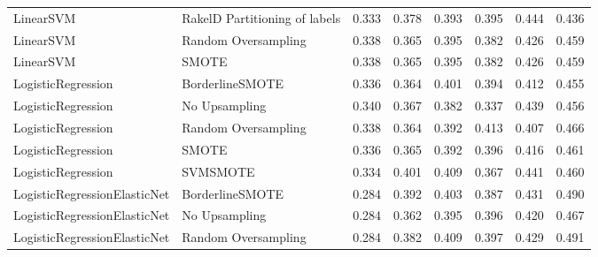 \begin{tabular}{llllllll}
                      LinearSVM & RakelD Partitioning of labels & 0.333 &                     0.378 &                 0.393 &                  0.395 &                                   0.444 &     0.436 \\
                      LinearSVM &           Random Oversampling & 0.338 &                     0.365 &                 0.395 &                  0.382 &                                   0.426 &     0.459 \\
                      LinearSVM &                         SMOTE & 0.338 &                     0.365 &                 0.395 &                  0.382 &                                   0.426 &     0.459 \\
             LogisticRegression &               BorderlineSMOTE & 0.336 &                     0.364 &                 0.401 &                  0.394 &                                   0.412 &     0.455 \\
             LogisticRegression &                 No Upsampling & 0.340 &                     0.367 &                 0.382 &                  0.337 &                                   0.439 &     0.456 \\
             LogisticRegression &           Random Oversampling & 0.338 &                     0.364 &                 0.392 &                  0.413 &                                   0.407 &     0.466 \\
             LogisticRegression &                         SMOTE & 0.336 &                     0.365 &                 0.392 &                  0.396 &                                   0.416 &     0.461 \\
             LogisticRegression &                      SVMSMOTE & 0.334 &                     0.401 &                 0.409 &                  0.367 &                                   0.441 &     0.460 \\
   LogisticRegressionElasticNet &               BorderlineSMOTE & 0.284 &                     0.392 &                 0.403 &                  0.387 &                                   0.431 &     0.490 \\
   LogisticRegressionElasticNet &                 No Upsampling & 0.284 &                     0.362 &                 0.395 &                  0.396 &                                   0.420 &     0.467 \\
   LogisticRegressionElasticNet &           Random Oversampling & 0.284 &                     0.382 &                 0.409 &                  0.397 &                                   0.429 &     0.491 \\

\end{tabular}
